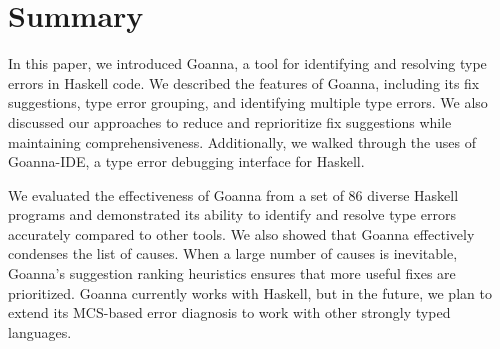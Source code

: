 %


    \section{Summary} \label{sec:conclusion}
    In this paper, we introduced Goanna, a tool for identifying and resolving type errors in Haskell code. We described the features of Goanna, including its fix suggestions, type error grouping, and identifying multiple type errors. We also discussed our approaches to reduce and reprioritize fix suggestions while maintaining comprehensiveness. Additionally, we walked through the uses of Goanna-IDE, a type error debugging interface for Haskell.

    We evaluated the effectiveness of Goanna from a set of 86 diverse Haskell programs and demonstrated its ability to identify and resolve type errors accurately compared to other tools. We also showed that Goanna effectively condenses the list of causes. When a large number of causes is inevitable, Goanna's suggestion ranking heuristics ensures that more useful fixes are prioritized. Goanna currently works with Haskell, but in the future, we plan to extend its MCS-based error diagnosis to work with other strongly typed languages.
    